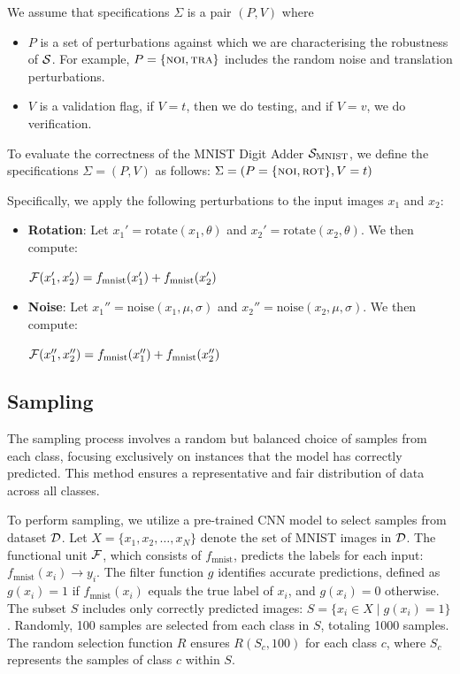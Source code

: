 \documentclass[10pt, conference, a4paper, final]{IEEEtran}
\begin{document}
We assume that specifications $\Sigma$ is a pair $(P, V)$ where
\begin{itemize}
\item $P$ is a set of perturbations against which we are characterising the robustness of $\S$. For example, $P = \{\noise,\translation\}$ includes the random noise and translation perturbations.

\item $V$ is a validation flag, if $V=t$, then we do testing, and if $V=v$, we do verification.
\end{itemize}


\begin{example}
    To evaluate the correctness of the MNIST Digit Adder $\S_{\text{MNIST}}$, we define the specifications $\Sigma = (P, V)$ as follows:
    $\Sigma = (P = \{\noise,\rotation\},  V=t)$
  
    Specifically, we apply the following perturbations to the input images $x_1$ and $x_2$:
    \begin{itemize} 
        \item \textbf{Rotation}: Let $x_1' = \text{rotate}(x_1, \theta)$ and $x_2' = \text{rotate}(x_2, \theta)$. We then compute:
       
        $\F(x_1', x_2') = f_{\text{mnist}}(x_1') + f_{\text{mnist}}(x_2')$
        \item \textbf{Noise}: Let $x_1'' = \text{noise}(x_1, \mu, \sigma)$ and $x_2'' = \text{noise}(x_2, \mu, \sigma)$. We then compute:
        
        $\F(x_1'', x_2'') = f_{\text{mnist}}(x_1'') + f_{\text{mnist}}(x_2'')$
    \end{itemize}
  
  \end{example}
  

\subsection{Sampling}
The sampling process involves a random but balanced choice of samples from each class, focusing exclusively on instances that the model has correctly predicted. This method ensures a representative and fair distribution of data across all classes. 

\begin{example}
    To perform sampling, we utilize a pre-trained CNN model to select samples from dataset $\D$. Let $X = \{x_1, x_2, \dots, x_N\}$ denote the set of MNIST images in $\D$. The functional unit $\F$, which consists of $f_{\text{mnist}}$, predicts the labels for each input: $f_{\text{mnist}}(x_i) \rightarrow y_i$. The filter function $g$ identifies accurate predictions, defined as $g(x_i) = 1$ if $f_{\text{mnist}}(x_i)$ equals the true label of $x_i$, and $g(x_i) = 0$ otherwise. The subset $S$ includes only correctly predicted images: $S = \{x_i \in X \mid g(x_i) = 1\}$. Randomly, 100 samples are selected from each class in $S$, totaling 1000 samples. The random selection function $R$ ensures $R(S_c, 100)$ for each class $c$, where $S_c$ represents the samples of class $c$ within $S$.
  \end{example} 
\end{document}
